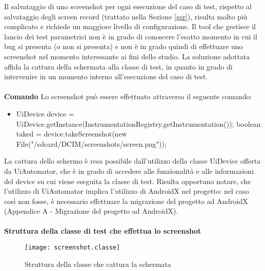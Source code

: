 \label{gss} 
Il salvataggio di uno screenshot per ogni esecuzione del caso di test, rispetto al salvataggio degli screen record (trattato nella Sezione \ref{gsr}), risulta molto più complicato e richiede un maggiore livello di configurazione. Il tool che gestisce il lancio dei test parametrici non è in grado di conoscere l'esatto momento in cui il bug si presenta (o non si presenta) e non è in grado quindi di effettuare uno screenshot nel momento interessante ai fini dello studio. La soluzione adottata affida la cattura della schermata alla classe di test, in quanto in grado di intervenire in un momento interno all'esecuzione del caso di test. 
\\\\
\noindent\textbf{Comando} \newline
Lo screenshot può essere effettuato attraverso il seguente comando:
\begin{itemize} [nosep]
\item[]  \small{UiDevice device = UiDevice.getInstance(InstrumentationRegistry.getInstrumentation()); \newline
 boolean taked = device.takeScreenshot(new File("/sdcard/DCIM/screenshots/screen.png"));}
\end{itemize}
La cattura dello schermo è resa possibile dall'utilizzo della classe UiDevice offerta da UiAutomator, che è in grado di accedere alle funzionalità e alle informazioni del device su cui viene eseguita la classe di test. Risulta opportuno notare, che l'utilizzo di UiAutomator implica l'utilizzo di AndroidX nel progetto: nel caso così non fosse, è necessario effettuare la migrazione del progetto ad AndroidX (Appendice A - Migrazione del progetto ad AndroidX).\\\\
\bigskip
\noindent\textbf{Struttura della classe di test che effettua lo screenshot}

\begin{figure}[H]
	\texttt{[image: screenshot.classe]}
	\centering
	\caption{Struttura della classe che cattura la schermata}
    \label{fig:screens}
\end{figure}

